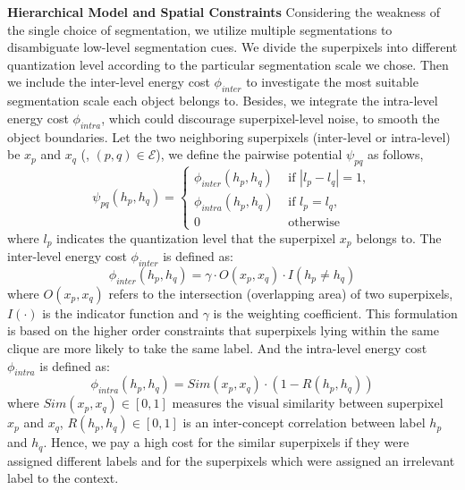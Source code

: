 \textbf{Hierarchical Model and Spatial Constraints}
Considering the weakness of the single choice of segmentation, we utilize multiple segmentations to disambiguate low-level segmentation cues.
We divide the superpixels into different quantization level according to the particular segmentation scale we chose.
Then we include the inter-level energy cost $\phi_{inter}$ to investigate the most suitable segmentation scale each object belongs to.
Besides, we integrate the intra-level energy cost $\phi_{intra}$, which could discourage superpixel-level noise, to smooth the object boundaries.
Let the two neighboring superpixels (inter-level or intra-level) be $x_p$ and $x_q$ (\ie, $(p,q) \in \mathcal{E}$), we define the pairwise potential $\psi_{pq}$ as follows,
\begin{equation}
    \psi_{pq}(h_p,h_q) =
    \begin{cases}
        \phi_{inter}(h_p,h_q) &\mbox{ if } | l_p - l_q | = 1,
        \\
        \phi_{intra}(h_p,h_q) &\mbox{ if } l_p = l_q,
        \\
        0 &\mbox{ otherwise }
    \end{cases}
\end{equation}
where $l_p$ indicates the quantization level that the superpixel $x_p$ belongs to.
The inter-level energy cost $\phi_{inter}$ is defined as:
\begin{equation}
    \phi_{inter}(h_p,h_q) = \gamma \cdot O(x_p,x_q) \cdot I(h_p \neq h_q)
\end{equation}
where $O(x_p,x_q)$ refers to the intersection (overlapping area) of two superpixels, $I(\cdot)$ is the indicator function and $\gamma$ is the weighting coefficient.
This formulation is based on the higher order constraints \cite{kohli2009robust,ladicky2009associative} that superpixels lying within the same clique are more likely to take the same label.
And the intra-level energy cost $\phi_{intra}$ is defined as:
\begin{equation}
    \phi_{intra}(h_p,h_q) = Sim(x_p,x_q) \cdot (1-R(h_p,h_q))
\end{equation}
where $Sim(x_p,x_q) \in [0,1]$ measures the visual similarity between superpixel $x_p$ and $x_q$, $R(h_p,h_q) \in [0,1]$ is an inter-concept correlation between label $h_p$ and $h_q$.
Hence, we pay a high cost for the similar superpixels if they were assigned different labels and for the superpixels which were assigned an irrelevant label to the context.

